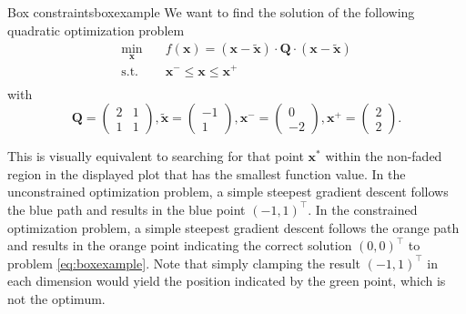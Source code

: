 \begin{example}{Box constraints}{boxexample}
    We want to find the solution of the following quadratic optimization problem
    \begin{equation}
        \begin{aligned}
            \min_{\mathbf{x}} \quad & f(\mathbf{x})= (\mathbf{x}-\tilde{\mathbf{x}}) \cdot \mathbf{Q} \cdot (\mathbf{x}-\tilde{\mathbf{x}})\\
            \textrm{s.t.} \quad     & \mathbf{x}^- \le \mathbf{x} \le \mathbf{x}^+\\
        \end{aligned}
        \label{eq:boxexample}
    \end{equation}
    with 
    \begin{equation}
        \mathbf{Q} = 
        \begin{pmatrix}
        2 & 1 \\
        1 & 1 
        \end{pmatrix}
        ,
        \tilde{\mathbf{x}} = 
        \begin{pmatrix}
        -1\\
        1 
        \end{pmatrix}
        ,
        \mathbf{x}^- = 
        \begin{pmatrix}
        0\\
        -2 
        \end{pmatrix}
        ,
        \mathbf{x}^+ = 
        \begin{pmatrix}
        2\\
        2 
        \end{pmatrix}
        .
    \end{equation}

    \begin{center}
        
    \end{center}

    This is visually equivalent to searching for that point $\mathbf{x}^*$ within the non-faded region in the displayed plot that has the smallest function value. In the unconstrained optimization problem, a simple steepest gradient descent follows the blue path and results in the blue point $(-1, 1)^\top$. In the constrained optimization problem, a simple steepest gradient descent follows the orange path and results in the orange point indicating the correct solution $(0, 0)^\top$ to problem \eqref{eq:boxexample}. Note that simply clamping the result $(-1, 1)^\top$ in each dimension would yield the position indicated by the green point, which is not the optimum.    
\end{example}


